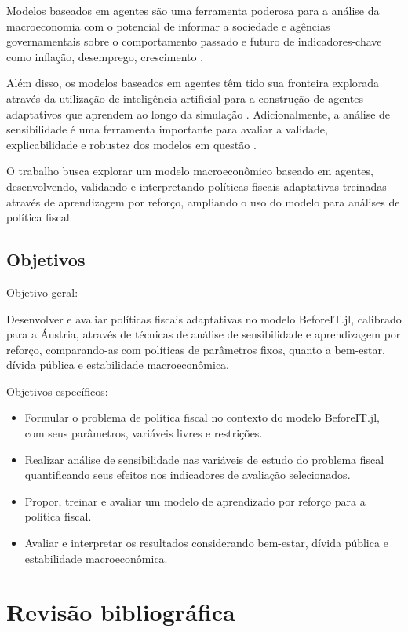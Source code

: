 \documentclass[12pt,a4paper]{article}
\let\cite\citep
\begin{document}
Modelos baseados em agentes são uma ferramenta poderosa para a análise da macroeconomia com o potencial de informar a sociedade e agências governamentais sobre o comportamento passado e futuro de indicadores-chave como inflação, desemprego, crescimento \cite{arthur2013,gallegati2012,dawid2018}.

Além disso, os modelos baseados em agentes têm tido sua fronteira explorada através da utilização de inteligência artificial para a construção de agentes adaptativos que aprendem ao longo da simulação \cite{brusatin2024, zheng2022}. Adicionalmente, a análise de sensibilidade é uma ferramenta importante para avaliar a validade, explicabilidade e robustez dos modelos em questão \cite{angione2022}.

O trabalho busca explorar um modelo macroeconômico baseado em agentes, desenvolvendo, validando e interpretando políticas fiscais adaptativas treinadas através de aprendizagem por reforço, ampliando o uso do modelo para análises de política fiscal.

\subsection{Objetivos}

Objetivo geral:

Desenvolver e avaliar políticas fiscais adaptativas no modelo BeforeIT.jl, calibrado para a Áustria, através de técnicas de análise de sensibilidade e aprendizagem por reforço, comparando-as com políticas de parâmetros fixos, quanto a bem-estar, dívida pública e estabilidade macroeconômica.

Objetivos específicos:
\begin{itemize}
    \item Formular o problema de política fiscal no contexto do modelo BeforeIT.jl, com seus parâmetros, variáveis livres e restrições.
    \item Realizar análise de sensibilidade nas variáveis de estudo do problema fiscal quantificando seus efeitos nos indicadores de avaliação selecionados.
    \item Propor, treinar e avaliar um modelo de aprendizado por reforço para a política fiscal.
    \item Avaliar e interpretar os resultados considerando bem-estar, dívida pública e estabilidade macroeconômica.
\end{itemize}

\section{Revisão bibliográfica}
\end{document}
